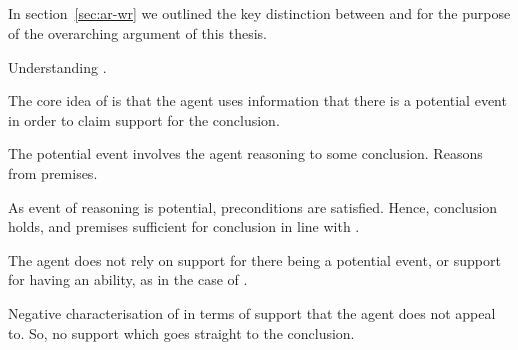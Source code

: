\subsection{\WR{}}
\label{sec:wr}

\begin{note}[Overview]
  In section~\ref{sec:ar-wr} we outlined the key distinction between \AR{} and \WR{} for the purpose of the overarching argument of this thesis.

  Understanding \WR{}.
\end{note}

\begin{note}
  The core idea of \WR{} is that the agent uses information that there is a potential event in order to claim support for the conclusion.

  The potential event involves the agent reasoning to some conclusion.
  Reasons from premises.

  As event of reasoning is potential, preconditions are satisfied.
  Hence, conclusion holds, and premises sufficient for conclusion in line with \USE{}.


  The agent does not rely on support for there being a potential event, or support for having an ability, as in the case of \AR{}.
\end{note}

\begin{note}
  Negative characterisation of \WR{} in terms of support that the agent does not appeal to.
  So, no support which goes straight to the conclusion.
\end{note}



